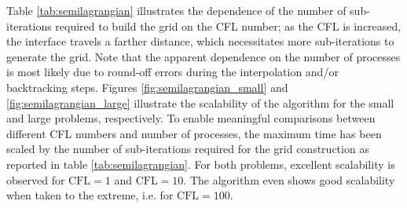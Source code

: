 Table \ref{tab:semilagrangian} illustrates the dependence of the number of sub-iterations required to build the grid on the CFL number; as the CFL is increased, the interface travels a farther distance, which necessitates more sub-iterations to generate the grid. Note that the apparent dependence on the number of processes is most likely due to round-off errors during the interpolation and/or backtracking steps. Figures \ref{fig:semilagrangian_small} and \ref{fig:semilagrangian_large} illustrate the scalability of the algorithm for the small and large problems, respectively. To enable meaningful comparisons between different CFL numbers and number of processes, the maximum time has been scaled by the number of sub-iterations required for the grid construction as reported in table \ref{tab:semilagrangian}. For both problems, excellent scalability is observed for $\text{CFL} = 1$ and $\text{CFL} = 10$. The algorithm even shows good scalability when taken to the extreme, i.e. for $\text{CFL} = 100$.

